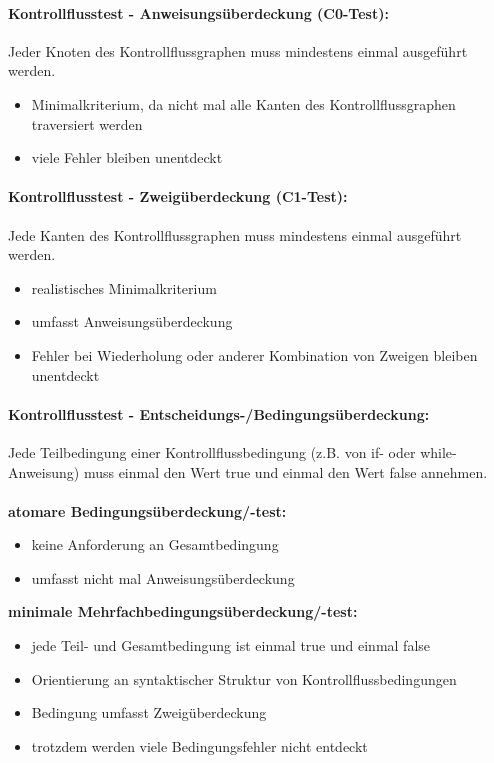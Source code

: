 \paragraph{Kontrollflusstest - Anweisungsüberdeckung (C0-Test):}
Jeder Knoten des Kontrollflussgraphen muss mindestens einmal ausgeführt werden.
\begin{itemize}
	\item Minimalkriterium, da nicht mal alle Kanten des Kontrollflussgraphen traversiert werden
	\item viele Fehler bleiben unentdeckt
\end{itemize}

\paragraph{Kontrollflusstest - Zweigüberdeckung (C1-Test):}
Jede Kanten des Kontrollflussgraphen muss mindestens einmal ausgeführt werden.
\begin{itemize}
	\item realistisches Minimalkriterium
	\item umfasst Anweisungsüberdeckung
	\item Fehler bei Wiederholung oder anderer Kombination von Zweigen bleiben unentdeckt
\end{itemize}

\paragraph{Kontrollflusstest - Entscheidungs-/Bedingungsüberdeckung:}

Jede Teilbedingung einer Kontrollflussbedingung (z.B. von if- oder while-Anweisung) muss einmal den Wert true und einmal den Wert false annehmen.
\\
\\
\textbf{atomare Bedingungsüberdeckung/-test:}
\begin{itemize}
	\item keine Anforderung an Gesamtbedingung
	\item umfasst nicht mal Anweisungsüberdeckung
\end{itemize}
\textbf{minimale Mehrfachbedingungsüberdeckung/-test:}
\begin{itemize}
\item jede Teil- und Gesamtbedingung ist einmal true und einmal false
\item Orientierung an syntaktischer Struktur von Kontrollflussbedingungen
\item Bedingung umfasst Zweigüberdeckung
\item trotzdem werden viele Bedingungsfehler nicht entdeckt
\end{itemize}

